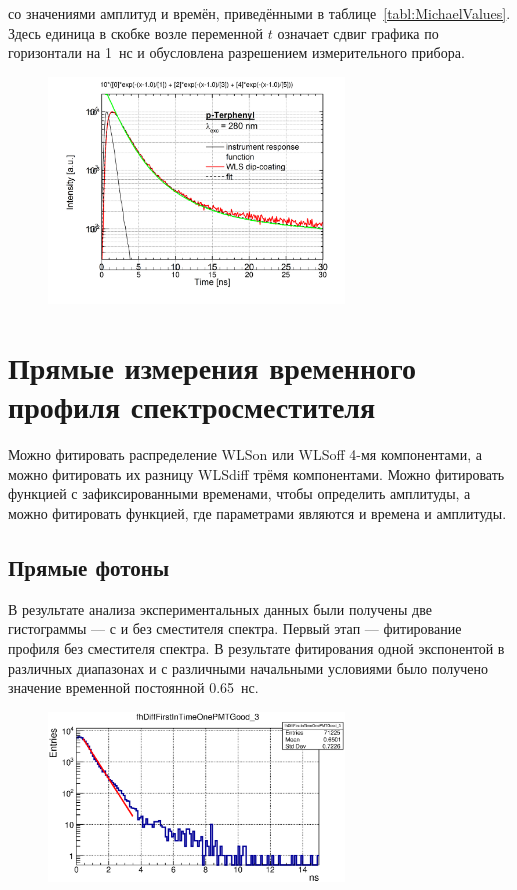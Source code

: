 со значениями амплитуд и времён, приведёнными в таблице~\ref{tabl:MichaelValues}. Здесь единица в скобке возле переменной $ t $ означает сдвиг графика по горизонтали на 1~нс и обусловлена разрешением измерительного прибора.

\begin{figure}[H]
\includegraphics[width=0.7\textwidth]{pictures/FluoroFitting_shift_1ns_2.png}
\caption{}
\label{fig:MichaelProfileFit}
\end{figure}


\section{Прямые измерения временного профиля спектросместителя}

Можно фитировать распределение WLS\textunderscore on или WLS\textunderscore off 4-мя компонентами, а можно фитировать их разницу WLS\textunderscore diff трёмя компонентами. Можно фитировать функцией с зафиксированными временами, чтобы определить амплитуды, а можно фитировать функцией, где параметрами являются и времена и амплитуды.

\subsection{Прямые фотоны}

В результате анализа экспериментальных данных были получены две гистограммы --- с и без сместителя спектра. Первый этап --- фитирование профиля без сместителя спектра. В результате фитирования одной экспонентой в различных диапазонах и с различными начальными условиями было получено значение временной постоянной 0.65~нс.

\begin{figure}[H]
\includegraphics[width=0.7\textwidth]{pictures/WLS_off_fitting.eps}
\caption{}
\label{fig:DirectPhotons}
\end{figure}

